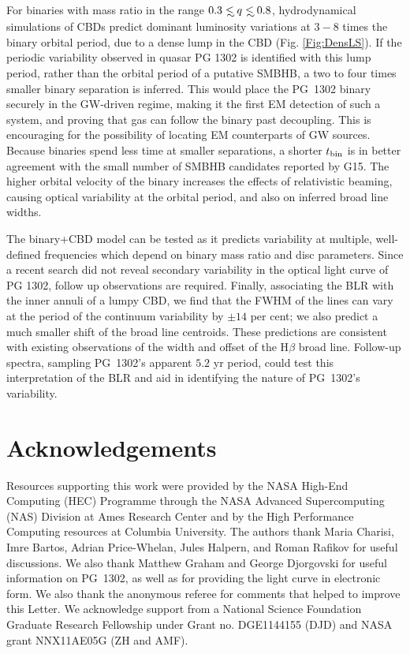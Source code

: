 For binaries with mass ratio in the range $0.3 \lsim q \lsim 0.8$,
hydrodynamical simulations of CBDs predict dominant
luminosity variations at $3-8$ times the binary orbital period, due to
a dense lump in the CBD (Fig. \ref{Fig:DensLS}). If the periodic
variability observed in quasar PG 1302 is identified with this lump
period, rather than the orbital period of a putative SMBHB, a two to four
times smaller binary separation is inferred. This would place the
PG~1302 binary securely in the GW-driven regime, making it the first
EM detection of such a system, and proving that gas can follow the
binary past decoupling. This is encouraging for the possibility of
locating EM counterparts of GW sources.  Because binaries spend less
time at smaller separations, a shorter $t_{\rm bin}$ is in better
agreement with the small number of SMBHB candidates reported by
G15. The higher orbital velocity of the binary increases the effects
of relativistic beaming, causing optical variability at the orbital
period, and also on inferred broad line widths.  

The binary+CBD model can be tested as it predicts variability at
multiple, well-defined frequencies which depend on binary mass ratio
and disc parameters. Since a recent search \citep{Charisi:2015:PG1302}
did not reveal secondary variability in the optical light curve of PG
1302, follow up observations are required.  Finally, associating the
BLR with the inner annuli of a lumpy CBD, we find that
the FWHM of the lines can vary at the period of the continuum variability by $\pm 14$ per cent; we also predict a much smaller shift
of the broad line centroids.  These predictions are consistent with
existing observations of the width and offset of the H$\beta$ broad
line. Follow-up spectra, sampling PG~1302's apparent $5.2$ yr
period, could test this interpretation of the BLR
and aid in identifying the nature of PG~1302's variability.



\vspace{-\baselineskip}
\section*{Acknowledgements}
Resources supporting this work were provided by the NASA High-End
Computing (HEC) Programme through the NASA Advanced
Supercomputing (NAS) Division at Ames Research Center and by
the High Performance Computing resources at Columbia University.
The authors thank Maria Charisi, Imre Bartos, Adrian Price-Whelan,
Jules Halpern, and Roman Rafikov for useful discussions. We
also thank Matthew Graham and George Djorgovski for useful information
on PG~1302, as well as for providing the light curve in electronic
form. We also thank the anonymous referee
for comments that helped to improve this Letter. We acknowledge support from a National Science Foundation
Graduate Research Fellowship under Grant no. DGE1144155 (DJD) and NASA
grant NNX11AE05G (ZH and AMF).

\vspace{-\baselineskip}

%


%

\renewcommand\thesection{\thechapter.\arabic{section}}

